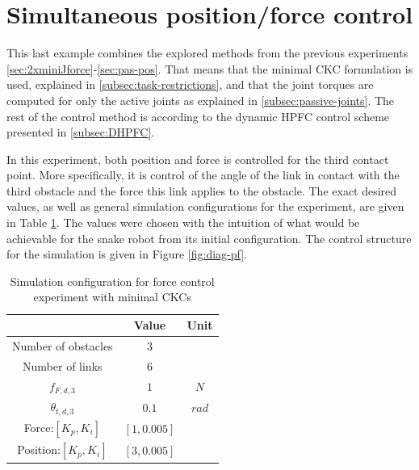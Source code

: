 \section{Simultaneous position/force control}\label{sec:pos-force-control-exp}

This last example combines the explored methods from the previous experiments \ref{sec:2xminiJforce}-\ref{sec:pas-pos}. That means that the minimal CKC formulation is used, explained in \ref{subsec:task-restrictions}, and that the joint torques are computed for only the active joints as explained in \ref{subsec:passive-joints}. The rest of the control method is according to the dynamic HPFC control scheme presented in \ref{subsec:DHPFC}.

In this experiment, both position and force is controlled for the third contact point. More specifically, it is control of the angle of the link in contact with the third obstacle and the force this link applies to the obstacle. The exact desired values, as well as general simulation configurations for the experiment, are given in Table \ref{tab:p+f}. The values were chosen with the intuition of what would be achievable for the snake robot from its initial configuration. The control structure for the simulation is given in Figure \ref{fig:diag-pf}.

\begin{table}[]
    \centering
    \begin{tabular}{|c|c|c|}
        \hline
        & Value & Unit\\
        \hline
        Number of obstacles & $3$ & \\
        Number of links & $6$ & \\
        $f_{F,d,3}$ & $1$ & $N$ \\
        $\theta_{t,d,3}$ & $0.1$ & $rad$ \\
        Force:$[K_{p}, K_{i}]$ & $[1, 0.005]$ &\\
        Position:$[K_{p}, K_{i}]$ & $[3, 0.005]$ &\\
        \hline
    \end{tabular}
    \caption{Simulation configuration for force control experiment with minimal CKCs}
    \label{tab:p+f}
\end{table}


